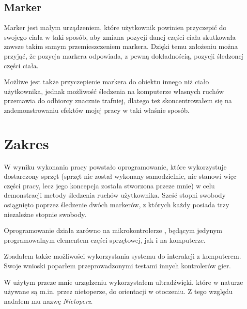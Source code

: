 \subsection{Marker}
Marker jest małym urządzeniem, które użytkownik powinien przyczepić do swojego ciała w taki sposób, aby zmiana pozycji danej części ciała skutkowała zawsze takim samym przemieszczeniem markera. Dzięki temu założeniu można przyjąć, że pozycja markera odpowiada, z pewną dokładnością, pozycji śledzonej części ciała.

Możliwe jest także przyczepienie markera do obiektu innego niż ciało użytkownika, jednak możliwość śledzenia na komputerze własnych ruchów przemawia do odbiorcy znacznie trafniej, dlatego też skoncentrowałem się na zademonstrowaniu efektów mojej pracy w taki właśnie sposób.

\section{Zakres}
W wyniku wykonania pracy powstało oprogramowanie, które wykorzystuje dostarczony sprzęt (sprzęt nie został wykonany samodzielnie, nie stanowi więc części pracy, lecz jego koncepcja została stworzona przeze mnie) w celu demonstracji metody śledzenia ruchów użytkownika. Sześć stopni swobody osiągnięto poprzez śledzenie dwóch markerów, z których każdy posiada trzy niezależne stopnie swobody.

Oprogramowanie działa zarówno na mikrokontrolerze , będącym jedynym programowalnym elementem części sprzętowej, jak i na komputerze.

Zbadałem także możliwości wykorzystania systemu do interakcji z komputerem. Swoje wnioski poparłem przeprowadzonymi testami innych kontrolerów gier.

W użytym przeze mnie urządzeniu wykorzystałem ultradźwięki, które w naturze używane są m.in. przez nietoperze, do orientacji w otoczeniu. Z tego względu nadałem mu nazwę \textsl{Nietoperz}.

